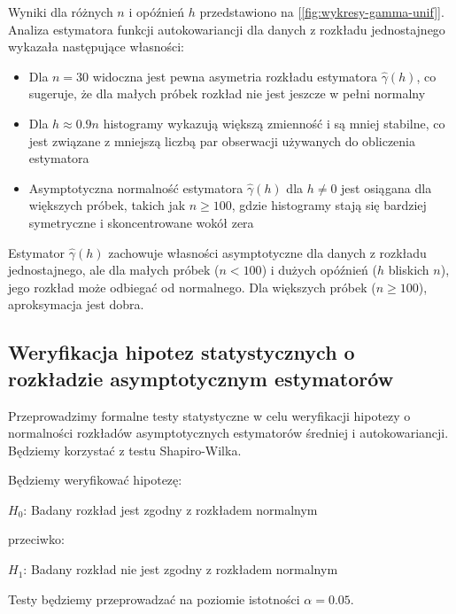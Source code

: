 \documentclass[10pt, a4paper]{article}\usepackage[]{graphicx}\usepackage[]{xcolor}
\begin{document}
Wyniki dla różnych \( n \) i opóźnień \( h \) przedstawiono na [\ref{fig:wykresy-gamma-unif}]. Analiza estymatora funkcji autokowariancji dla danych z rozkładu jednostajnego wykazała następujące własności:
\begin{itemize}
    \item Dla \( n = 30 \) widoczna jest pewna asymetria rozkładu estymatora \( \hat{\gamma}(h) \), co sugeruje, że dla małych próbek rozkład nie jest jeszcze w pełni normalny
    \item Dla \( h \approx 0.9n \) histogramy wykazują większą zmienność i są mniej stabilne, co jest związane z mniejszą liczbą par obserwacji używanych do obliczenia estymatora
    \item Asymptotyczna normalność estymatora \( \hat{\gamma}(h) \) dla \( h \neq 0 \) jest osiągana dla większych próbek, takich jak \( n \geq 100 \), gdzie histogramy stają się bardziej symetryczne i skoncentrowane wokół zera
\end{itemize}

Estymator \( \hat{\gamma}(h) \) zachowuje własności asymptotyczne dla danych z rozkładu jednostajnego, ale dla małych próbek (\( n < 100 \)) i dużych opóźnień (\( h \) bliskich \( n \)), jego rozkład może odbiegać od normalnego. Dla większych próbek (\( n \geq 100 \)), aproksymacja jest dobra.



\subsection{Weryfikacja hipotez statystycznych o rozkładzie asymptotycznym estymatorów}

Przeprowadzimy formalne testy statystyczne w celu weryfikacji hipotezy o normalności rozkładów asymptotycznych estymatorów średniej i autokowariancji. Będziemy korzystać z testu Shapiro-Wilka.

Będziemy weryfikować hipotezę:

$H_0$: Badany rozkład jest zgodny z rozkładem normalnym

przeciwko:

$H_1$: Badany rozkład nie jest zgodny z rozkładem normalnym

Testy będziemy przeprowadzać na poziomie istotności $\alpha = 0.05$.
\end{document}
